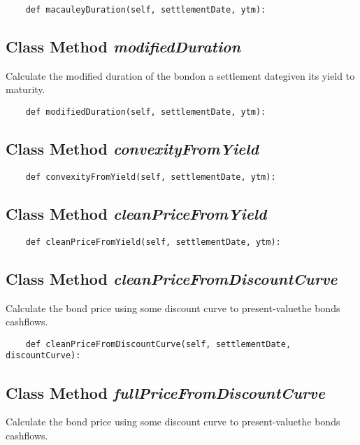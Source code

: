 \documentclass[twoside,11pt]{book}
\begin{document}
\begin{lstlisting}
    def macauleyDuration(self, settlementDate, ytm):
\end{lstlisting}

\subsection{Class Method {\it modifiedDuration}}
Calculate the modified duration of the bondon a settlement dategiven its yield to maturity. 

\begin{lstlisting}
    def modifiedDuration(self, settlementDate, ytm):
\end{lstlisting}

\subsection{Class Method {\it convexityFromYield}}


\begin{lstlisting}
    def convexityFromYield(self, settlementDate, ytm):
\end{lstlisting}

\subsection{Class Method {\it cleanPriceFromYield}}


\begin{lstlisting}
    def cleanPriceFromYield(self, settlementDate, ytm):
\end{lstlisting}

\subsection{Class Method {\it cleanPriceFromDiscountCurve}}
Calculate the bond price using some discount curve to present-valuethe bonds cashflows. 

\begin{lstlisting}
    def cleanPriceFromDiscountCurve(self, settlementDate, discountCurve):
\end{lstlisting}

\subsection{Class Method {\it fullPriceFromDiscountCurve}}
Calculate the bond price using some discount curve to present-valuethe bonds cashflows. 
\end{document}
